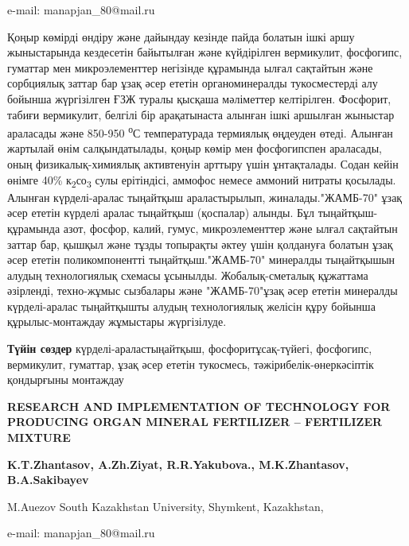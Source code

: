 e-mail: manapjan\_80@mail.ru

Қоңыр көмірді өндіру және дайындау кезінде пайда болатын ішкі аршу
жыныстарында кездесетін байытылған және күйдірілген вермикулит,
фосфогипс, гуматтар мен микроэлементтер негізінде құрамында ылғал
сақтайтын және сорбциялық заттар бар ұзақ әсер ететін органоминералды
тукосместерді алу бойынша жүргізілген ҒЗЖ туралы қысқаша мәліметтер
келтірілген. Фосфорит, табиғи вермикулит, белгілі бір арақатынаста
алынған ішкі аршылған жыныстар араласады және 850-950
\textsuperscript{о}С температурада термиялық өңдеуден өтеді. Алынған
жартылай өнім салқындатылады, қоңыр көмір мен фосфогипспен араласады,
оның физикалық-химиялық активтенуін арттыру үшін ұнтақталады. Содан
кейін өнімге 40\% к\textsubscript{2}со\textsubscript{3} сулы ерітіндісі,
аммофос немесе аммоний нитраты қосылады. Алынған күрделі-аралас
тыңайтқыш араластырылып, жиналады."ЖАМБ-70" ұзақ әсер ететін күрделі
аралас тыңайтқыш (қоспалар) алынды. Бұл тыңайтқыш-құрамында азот,
фосфор, калий, гумус, микроэлементтер және ылғал сақтайтын заттар бар,
қышқыл және тұзды топырақты әктеу үшін қолдануға болатын ұзақ әсер
ететін поликомпонентті тыңайтқыш."ЖАМБ-70" минералды тыңайтқышын алудың
технологиялық схемасы ұсынылды. Жобалық-сметалық құжаттама әзірленді,
техно-жұмыс сызбалары және "ЖАМБ-70"ұзақ әсер ететін минералды
күрделі-аралас тыңайтқышты алудың технологиялық желісін құру бойынша
құрылыс-монтаждау жұмыстары жүргізілуде.

{\bfseries Түйін сөздер} күрделі-араластыңайтқыш, фосфоритұсақ-түйегі,
фосфогипс, вермикулит, гуматтар, ұзақ әсер ететін тукосмесь,
тәжірибелік-өнеркәсіптік қондырғыны монтаждау

{\bfseries RESEARCH AND IMPLEMENTATION OF TECHNOLOGY FOR PRODUCING ORGAN
MINERAL FERTILIZER -- FERTILIZER MIXTURE}

{\bfseries K.T.Zhantasov, A.Zh.Ziyat, R.R.Yakubova., M.K.Zhantasov,
B.A.Sakibayev}

M.Auezov South Kazakhstan University, Shymkent, Kazakhstan,

e-mail: manapjan\_80@mail.ru

